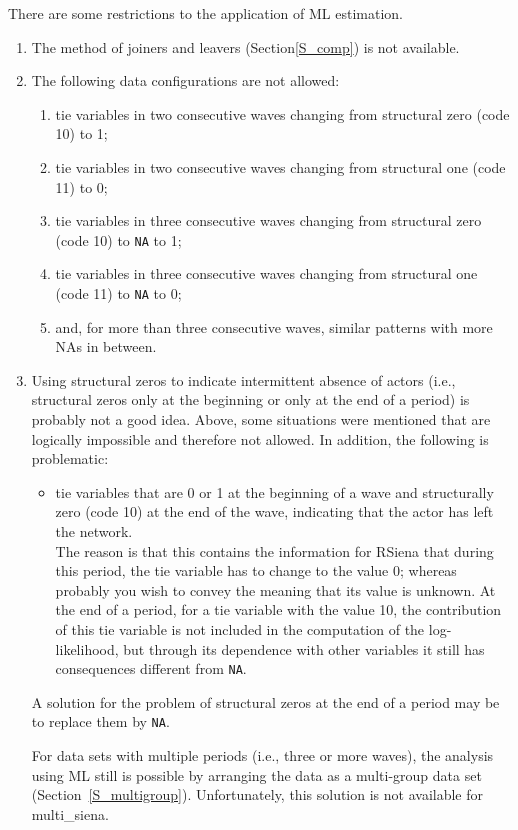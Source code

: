 \documentclass[a4paper,fleqn,11pt]{article}
\newcommand{\+}{\, + \,}
\newcommand{\RS}{{\sf \textsf{RSiena} }}
\begin{document}
There are some restrictions to the application of ML estimation.
\begin{enumerate}
  \item The method of joiners and leavers (Section\ref{S_comp})
is not available.
  \item The following data configurations are not allowed:
\begin{enumerate}
\item tie variables in two consecutive waves changing from
    structural zero (code 10) to 1;
\item tie variables in two consecutive waves changing from
    structural one (code 11) to 0;
\item tie variables in three consecutive waves changing from
    structural zero (code 10) to \texttt{NA} to 1;
\item tie variables in three consecutive waves changing from
    structural one (code 11) to \texttt{NA} to 0;
\item and, for more than three consecutive waves, similar patterns
    with more NAs in between.
\end{enumerate}
\item Using structural zeros to indicate intermittent absence of actors
    (i.e., structural zeros only at the beginning or only at the end
    of a period)   is probably not a good idea.
     Above, some situations were mentioned that are logically impossible
     and therefore not allowed.
     In addition, the following is problematic:
\begin{itemize}
\item tie variables that are 0 or 1 at the beginning of a wave and
      structurally zero (code 10) at the end of the wave,
      indicating that the actor has left the network.\\
      The reason is that this contains the information for \RS that during
      this period, the tie variable has to change to the value 0;
      whereas probably you wish to convey the meaning that its value
      is unknown. At the end of a period, for a tie variable with
      the value 10, the contribution of this tie variable is not included
      in the computation of the log-likelihood,
      but through its dependence with other
      variables it still has consequences different from \texttt{NA}.
\end{itemize}
A solution for the problem of structural zeros at the end
of a period may be to replace them by \texttt{NA}.

For data sets with multiple periods (i.e., three or more waves), the
analysis using ML still is possible
\citep[as proposed by][]{delaHayeETAl2017} by arranging the data
as a multi-group data set (Section~\ref{S_multigroup}).
Unfortunately, this solution is not available for
\textsf{multi\_siena}.
\end{enumerate}
\end{document}
